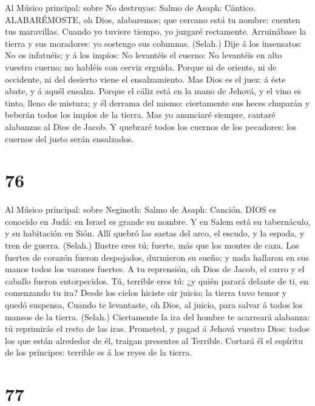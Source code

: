  Al Músico principal: sobre No destruyas: Salmo de Asaph:
Cántico. ALABARÉMOSTE, oh Dios, alabaremos; que cercano está tu nombre:
cuenten tus maravillas.  Cuando yo tuviere tiempo, yo
juzgaré rectamente.  Arruinábase la tierra y sus moradores:
yo sostengo sus columnas. (Selah.)  Dije á los insensatos:
No os infatuéis; y á los impíos: No levantéis el cuerno:  No
levantéis en alto vuestro cuerno; no habléis con cerviz erguida.
 Porque ni de oriente, ni de occidente, ni del desierto
viene el ensalzamiento.  Mas Dios es el juez: á éste abate,
y á aquél ensalza.  Porque el cáliz está en la mano de
Jehová, y el vino es tinto, lleno de mistura; y él derrama del mismo:
ciertamente sus heces chuparán y beberán todos los impíos de la tierra.
 Mas yo anunciaré siempre, cantaré alabanzas al Dios de
Jacob.  Y quebraré todos los cuernos de los pecadores: los
cuernos del justo serán ensalzados.

\hypertarget{section-75}{%
\section{76}\label{section-75}}

 Al Músico principal: sobre Neginoth: Salmo de Asaph:
Canción. DIOS es conocido en Judá: en Israel es grande su nombre.
 Y en Salem está su tabernáculo, y su habitación en Sión.
 Allí quebró las saetas del arco, el escudo, y la espada, y
tren de guerra. (Selah.)  Ilustre eres tú; fuerte, más que
los montes de caza.  Los fuertes de corazón fueron
despojados, durmieron su sueño; y nada hallaron en sus manos todos los
varones fuertes.  A tu reprensión, oh Dios de Jacob, el
carro y el caballo fueron entorpecidos.  Tú, terrible eres
tú: ¿y quién parará delante de ti, en comenzando tu ira? 
Desde los cielos hiciste oir juicio; la tierra tuvo temor y quedó
suspensa,  Cuando te levantaste, oh Dios, al juicio, para
salvar á todos los mansos de la tierra. (Selah.) 
Ciertamente la ira del hombre te acarreará alabanza: tú reprimirás el
resto de las iras.  Prometed, y pagad á Jehová vuestro
Dios: todos los que están alrededor de él, traigan presentes al
Terrible.  Cortará él el espíritu de los príncipes:
terrible es á los reyes de la tierra.

\hypertarget{section-76}{%
\section{77}\label{section-76}}

